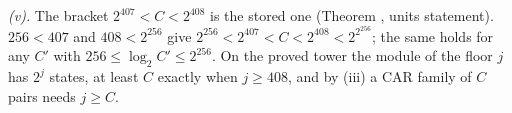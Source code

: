 \emph{(v).} The bracket $2^{407} < C < 2^{408}$ is the stored one (Theorem , units statement). $256 < 407$ and $408 < 2^{256}$ give $2^{256} < 2^{407} < C < 2^{408} < 2^{2^{256}}$; the same holds for any $C'$ with $256 \le \log_{2}C' \le 2^{256}$. On the proved tower the module of the floor $j$ has $2^{j}$ states, at least $C$ exactly when $j \ge 408$, and by (iii) a CAR family of $C$ pairs needs $j \ge C$.
